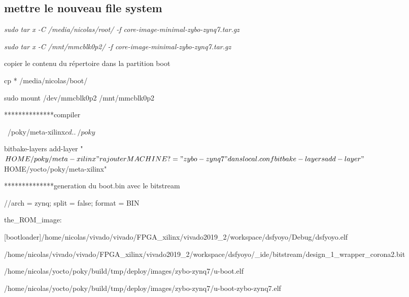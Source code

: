 
\subsection{mettre le nouveau file system}


\textit{sudo tar x -C /media/nicolas/root/ -f core-image-minimal-zybo-zynq7.tar.gz}

\textit{sudo tar x -C /mnt/mmcblk0p2/ -f core-image-minimal-zybo-zynq7.tar.gz}



copier le contenu du répertoire dans la partition boot

cp * /media/nicolas/boot/

sudo mount /dev/mmcblk0p2 /mnt/mmcblk0p2





**************compiler

~/poky/meta-xilinx$ cd ..

~/poky$

bitbake-layers add-layer "$HOME/poky/meta-xilinx"

rajouter MACHINE ?= "zybo-zynq7" dans local.conf

bitbake-layers add-layer "$HOME/yocto/poky/meta-xilinx"





**************generation du boot.bin avec le bitstream

//arch = zynq; split = false; format = BIN

the_ROM_image:

{

[bootloader]/home/nicolas/vivado/vivado/FPGA_xilinx/vivado2019_2/workspace/dsfyoyo/Debug/dsfyoyo.elf

/home/nicolas/vivado/vivado/FPGA_xilinx/vivado2019_2/workspace/dsfyoyo/_ide/bitstream/design_1_wrapper_corona2.bit

/home/nicolas/yocto/poky/build/tmp/deploy/images/zybo-zynq7/u-boot.elf

/home/nicolas/yocto/poky/build/tmp/deploy/images/zybo-zynq7/u-boot-zybo-zynq7.elf

}





